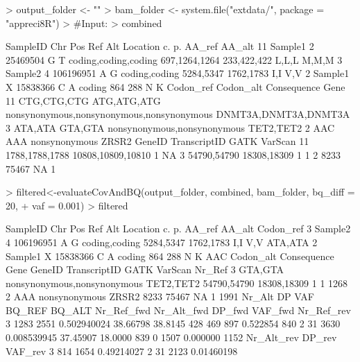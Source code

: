 \documentclass{article}
\begin{document}
\begin{Schunk}
\begin{Sinput}
> output_folder <- ""
> bam_folder <- system.file("extdata/", package = "appreci8R")
> #Input:
> combined
\end{Sinput}
\begin{Soutput}
   SampleID Chr       Pos Ref Alt             Location            c.          p. AA_ref AA_alt
11  Sample1   2  25469504   G   T coding,coding,coding 697,1264,1264 233,422,422  L,L,L  M,M,M
3   Sample2   4 106196951   A   G        coding,coding     5284,5347   1762,1783    I,I    V,V
2   Sample1   X  15838366   C   A               coding           864         288      N      K
     Codon_ref   Codon_alt                               Consequence                 Gene
11 CTG,CTG,CTG ATG,ATG,ATG nonsynonymous,nonsynonymous,nonsynonymous DNMT3A,DNMT3A,DNMT3A
3      ATA,ATA     GTA,GTA               nonsynonymous,nonsynonymous            TET2,TET2
2          AAC         AAA                             nonsynonymous                ZRSR2
           GeneID      TranscriptID GATK VarScan
11 1788,1788,1788 10808,10809,10810    1      NA
3     54790,54790       18308,18309    1       1
2            8233             75467   NA       1
\end{Soutput}
\begin{Sinput}
> filtered<-evaluateCovAndBQ(output_folder, combined, bam_folder, bq_diff = 20,
+                            vaf = 0.001)
> filtered
\end{Sinput}
\begin{Soutput}
  SampleID Chr       Pos Ref Alt      Location        c.        p. AA_ref AA_alt Codon_ref
3  Sample2   4 106196951   A   G coding,coding 5284,5347 1762,1783    I,I    V,V   ATA,ATA
2  Sample1   X  15838366   C   A        coding       864       288      N      K       AAC
  Codon_alt                 Consequence      Gene      GeneID TranscriptID GATK VarScan Nr_Ref
3   GTA,GTA nonsynonymous,nonsynonymous TET2,TET2 54790,54790  18308,18309    1       1   1268
2       AAA               nonsynonymous     ZRSR2        8233        75467   NA       1   1991
  Nr_Alt   DP         VAF   BQ_REF  BQ_ALT Nr_Ref_fwd Nr_Alt_fwd DP_fwd  VAF_fwd Nr_Ref_rev
3   1283 2551 0.502940024 38.66798 38.8145        428        469    897 0.522854        840
2     31 3630 0.008539945 37.45907 18.0000        839          0   1507 0.000000       1152
  Nr_Alt_rev DP_rev    VAF_rev
3        814   1654 0.49214027
2         31   2123 0.01460198
\end{Soutput}
\end{Schunk}
\end{document}
